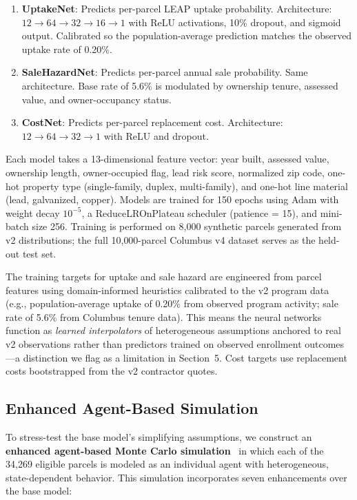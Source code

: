\documentclass[11pt, letterpaper]{article}
\begin{document}
\begin{enumerate}[nosep]
  \item \textbf{UptakeNet}: Predicts per-parcel LEAP uptake probability. Architecture: $12 \to 64 \to 32 \to 16 \to 1$ with ReLU activations, 10\% dropout, and sigmoid output. Calibrated so the population-average prediction matches the observed uptake rate of 0.20\%.
  \item \textbf{SaleHazardNet}: Predicts per-parcel annual sale probability. Same architecture. Base rate of 5.6\% is modulated by ownership tenure, assessed value, and owner-occupancy status.
  \item \textbf{CostNet}: Predicts per-parcel replacement cost. Architecture: $12 \to 64 \to 32 \to 1$ with ReLU and dropout.
\end{enumerate}

Each model takes a 13-dimensional feature vector: year built, assessed value, ownership length, owner-occupied flag, lead risk score, normalized zip code, one-hot property type (single-family, duplex, multi-family), and one-hot line material (lead, galvanized, copper). Models are trained for 150 epochs using Adam with weight decay $10^{-5}$, a ReduceLROnPlateau scheduler (patience = 15), and mini-batch size 256. Training is performed on 8{,}000 synthetic parcels generated from v2 distributions; the full 10{,}000-parcel Columbus v4 dataset serves as the held-out test set.

The training targets for uptake and sale hazard are engineered from parcel features using domain-informed heuristics calibrated to the v2 program data (e.g., population-average uptake of 0.20\% from observed program activity; sale rate of 5.6\% from Columbus tenure data). This means the neural networks function as \emph{learned interpolators} of heterogeneous assumptions anchored to real v2 observations rather than predictors trained on observed enrollment outcomes---a distinction we flag as a limitation in Section~5. Cost targets use replacement costs bootstrapped from the v2 contractor quotes.

\subsection{Enhanced Agent-Based Simulation}

To stress-test the base model's simplifying assumptions, we construct an \textbf{enhanced agent-based Monte Carlo simulation}~\cite{bonabeau2002} in which each of the 34{,}269 eligible parcels is modeled as an individual agent with heterogeneous, state-dependent behavior. This simulation incorporates seven enhancements over the base model:
\end{document}
